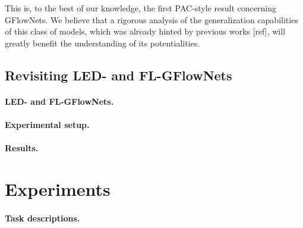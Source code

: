 \documentclass{article}
\theoremstyle{plain}
\theoremstyle{definition}
\theoremstyle{remark}
\theoremstyle{remark}
\begin{document}
This is, to the best of our knowledge, the first PAC-style result concerning GFlowNets. We believe that a rigorous analysis of the generalization capabilities of this class of models, which was already hinted by previous works [ref], will greatly benefit the understanding of its potentialities.   

\subsection{Revisiting LED- and FL-GFlowNets} \label{sec:rev} 

\paragraph{LED- and FL-GFlowNets.} 

\paragraph{Experimental setup.} 

\paragraph{Results.} 





\section{Experiments} \label{sec:experiments} 

\paragraph{Task descriptions.} 
\end{document}
